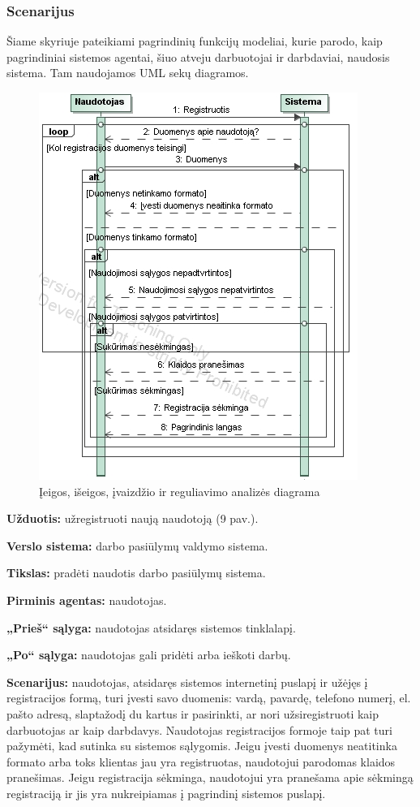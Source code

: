 \documentclass{VUMIFPSkursinis}
\begin{document}
\subsubsection{Scenarijus}
Šiame skyriuje pateikiami pagrindinių funkcijų modeliai, kurie parodo, kaip pagrindiniai sistemos agentai, šiuo atveju darbuotojai ir darbdaviai, naudosis sistema. Tam naudojamos UML sekų diagramos.
\begin{figure}[H]
\centering
\includegraphics[scale=1]{img/registracija.png}
\caption{Įeigos, išeigos, įvaizdžio ir reguliavimo analizės diagrama}
\end{figure}
\textbf{Užduotis:} užregistruoti naują naudotoją (9 pav.).

\textbf{Verslo sistema:} darbo pasiūlymų valdymo sistema.

\textbf{Tikslas:} pradėti naudotis darbo pasiūlymų sistema.

\textbf{Pirminis agentas:} naudotojas.

\textbf{„Prieš“ sąlyga:} naudotojas atsidaręs sistemos tinklalapį.

\textbf{„Po“ sąlyga:} naudotojas gali pridėti arba ieškoti darbų.

\textbf{Scenarijus:} naudotojas, atsidaręs sistemos internetinį puslapį ir užėjęs į registracijos formą, turi įvesti savo duomenis: vardą, pavardę, telefono numerį, el. pašto adresą, slaptažodį du kartus ir pasirinkti, ar nori užsiregistruoti kaip darbuotojas ar kaip darbdavys. Naudotojas registracijos formoje taip pat turi pažymėti, kad sutinka su sistemos sąlygomis. Jeigu įvesti duomenys neatitinka formato arba toks klientas jau yra registruotas, naudotojui parodomas klaidos pranešimas. Jeigu registracija sėkminga, naudotojui yra pranešama apie sėkmingą registraciją ir jis yra nukreipiamas į pagrindinį sistemos puslapį.
\end{document}
